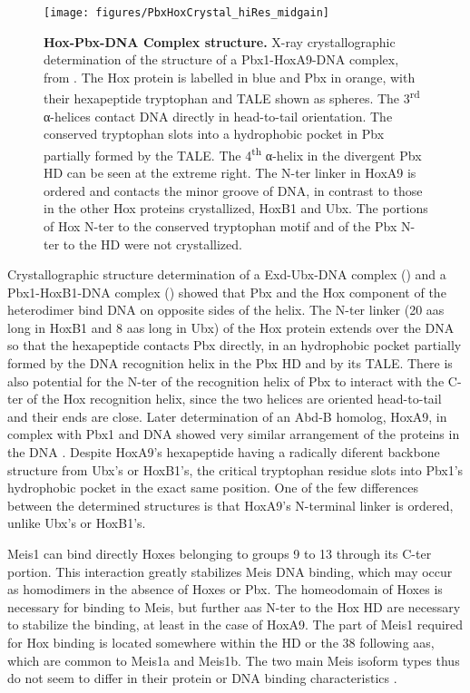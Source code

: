 \begin{figure}[]
  \centering
  \texttt{[image: figures/PbxHoxCrystal\_hiRes\_midgain]}
  \caption[Hox-Pbx-DNA Complex structure]{\textbf{Hox-Pbx-DNA Complex structure.} X-ray crystallographic determination of the structure of a Pbx1-HoxA9-DNA complex, from \cite{LaRonde-LeBlanc2003}. The Hox protein is labelled in blue and Pbx in orange, with their hexapeptide tryptophan and \ac{TALE} shown as spheres. The 3\textsuperscript{rd} α-helices contact DNA directly in head-to-tail orientation. The conserved tryptophan slots into a hydrophobic pocket in Pbx partially formed by the \ac{TALE}. The 4\textsuperscript{th} α-helix in the divergent Pbx \ac{HD} can be seen at the extreme right. The \ac{N-ter} linker in HoxA9 is ordered and contacts the minor groove of DNA, in contrast to those in the other Hox proteins crystallized, HoxB1 and Ubx. The portions of Hox \ac{N-ter} to the conserved tryptophan motif and of the Pbx \ac{N-ter} to the \ac{HD} were not crystallized.}
  \label{fig:PbxHoxCrystal}
\end{figure}

Crystallographic structure determination of a Exd-Ubx-DNA complex (\cite{Passner1999}) and a Pbx1-HoxB1-DNA complex (\cite{Piper1999}) showed that Pbx and the Hox component of the heterodimer bind DNA on opposite sides of the helix. The \ac{N-ter} linker (20 \acp{aa} long in HoxB1 and 8 \acp{aa} long in Ubx) of the Hox protein extends over the DNA so that the hexapeptide contacts Pbx directly, in an hydrophobic pocket partially formed by the DNA recognition helix in the Pbx \ac{HD} and by its \ac{TALE}. There is also potential for the \ac{N-ter} of the recognition helix of Pbx to interact with the \ac{C-ter} of the Hox recognition helix, since the two helices are oriented head-to-tail and their ends are close. Later determination of an \ac{Abd-B} homolog, HoxA9, in complex with Pbx1 and DNA showed very similar arrangement of the proteins in the DNA \parencite{LaRonde-LeBlanc2003}. Despite HoxA9's hexapeptide having a radically diferent backbone structure from Ubx's or HoxB1's, the critical tryptophan residue slots into Pbx1's hydrophobic pocket in the exact same position. One of the few differences between the determined structures is that HoxA9's N-terminal linker is ordered, unlike Ubx's or HoxB1's.


Meis1 can bind directly Hoxes belonging to groups 9 to 13 through its \ac{C-ter} portion. This interaction greatly stabilizes Meis DNA binding, which may occur as homodimers in the absence of Hoxes or Pbx. The homeodomain of Hoxes is necessary for binding to Meis, but further \acp{aa} \ac{N-ter} to the Hox \ac{HD} are necessary to stabilize the binding, at least in the case of HoxA9. The part of Meis1 required for Hox binding is located somewhere within the \ac{HD} or the 38 following \acp{aa}, which are common to Meis1a and Meis1b. The two main Meis isoform types thus do not seem to differ in their protein or DNA binding characteristics \parencite{Shen1997, Williams2005}. %

